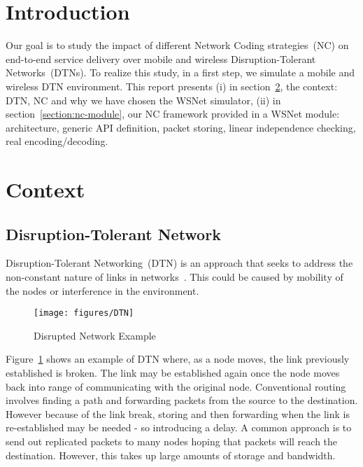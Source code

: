 \documentclass[a4paper,twoside]{article}
\begin{document}
\makeRT 

\tableofcontents
\newpage

\section{Introduction}

Our goal is to study the impact of different Network Coding strategies~(NC) on end-to-end service delivery over mobile and wireless Disruption-Tolerant Networks~(DTNs). To realize this study, in a first step, we simulate a mobile and wireless DTN environment. This report presents (i) in section~\ref{section:context}, the context: DTN, NC and why we have chosen the WSNet simulator, (ii) in section~\ref{section:nc-module}, our NC framework provided in a WSNet module: architecture, generic API definition, packet storing, linear independence checking, real encoding/decoding.

\section{Context}
\label{section:context}

\subsection{Disruption-Tolerant Network}

Disruption-Tolerant Networking~(DTN) is an approach that seeks to address the non-constant nature of links in networks~\cite{Fall:2003:DNA:863955.863960}. This could be caused by mobility of the nodes or interference in the environment. 

\begin{figure}[!hbt]
\centering
\texttt{[image: figures/DTN]}
\caption{Disrupted Network Example}
\label{fig:dtn}
\end{figure}

Figure~\ref{fig:dtn} shows an example of DTN where, as a node moves, the link previously established is broken. The link may be established again once the node moves back into range of communicating with the original node. Conventional routing involves finding a path and forwarding packets from the source to the destination. However because of the link break, storing and then forwarding when the link is re-established may be needed - so introducing a delay. A common approach is to send out replicated packets to many nodes hoping that packets will reach the destination. However, this takes up large amounts of storage and bandwidth.
\end{document}
